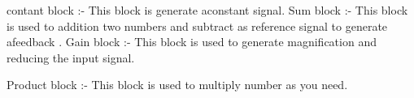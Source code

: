 contant block :-
               This block is generate aconstant signal.
Sum block :-
               This block is used to addition two numbers and subtract as reference signal to generate afeedback .
Gain block :-
               This block is used to generate magnification and reducing the input signal.
			   
Product block :-
               This block is used to multiply number as you need.
